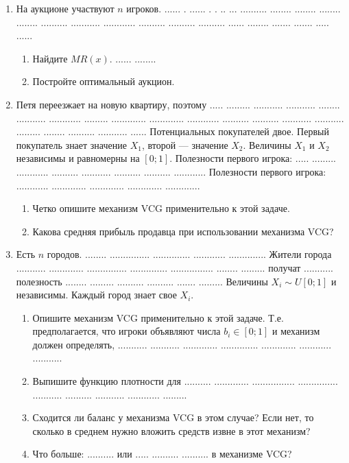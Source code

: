\documentclass[11pt, openany]{book}
\numberwithin{equation}{page} %
\theoremstyle{definition} %
\theoremstyle{definition}
\theoremstyle{definition}
\begin{document}
\begin{enumerate}

\item На аукционе участвуют $ n $ игроков. ...... . ...... . . .. ... .......... ........ ........ ........ ........ .......... ........... ............ .......... .......... .......... ...... ........ ....... ....... ..... ......
\begin{enumerate}
\item Найдите $ MR(x) $. ...... ........
\item Постройте оптимальный аукцион.
\end{enumerate}

\item Петя переезжает на новую квартиру, поэтому ..... ......... ........... ........... ........ ........... ............ ......... ............. ............. ............ .......... .......... ........... ........... ......... ........ .......... ........... ...... Потенциальных покупателей двое. Первый покупатель знает значение $ X_{1} $, второй --- значение $ X_{2} $. Величины  $ X_{1} $ и  $ X_{2} $ независимы и равномерны на $ [0;1] $. Полезности первого игрока: ..... ......... ............ .......... ........... .......... .......... ............ Полезности первого игрока: ............ ............. ............. ............. .............
\begin{enumerate}
\item Четко опишите механизм VCG применительно к этой задаче.
\item Какова средняя прибыль продавца при использовании механизма VCG?
\end{enumerate}


\item Есть $ n $ городов. ........ ............... .............. ............ .............. Жители города ........... ............. ............... .............. ................ ........ ......... получат ........... полезность ........ ......... .......... .......... ....... .........  Величины $ X_{i}\sim U[0;1] $ и независимы. Каждый город знает свое $ X_{i} $.
\begin{enumerate}
\item Опишите механизм VCG применительно к этой задаче. Т.е. предполагается, что игроки объявляют числа $ b_{i}\in [0;1] $ и механизм должен определять, ........... ........... ............. .............. ............. ............ ...........
\item Выпишите функцию плотности для .......... ............. ................ ............... ........... .......... ........... ............ .........
\item Сходится ли баланс у механизма VCG в этом случае? Если нет, то сколько в среднем нужно вложить средств извне в этот механизм?
\item Что больше: .......... или ..... .......... .......... в механизме VCG?
\end{enumerate}



\end{enumerate}
\end{document}
